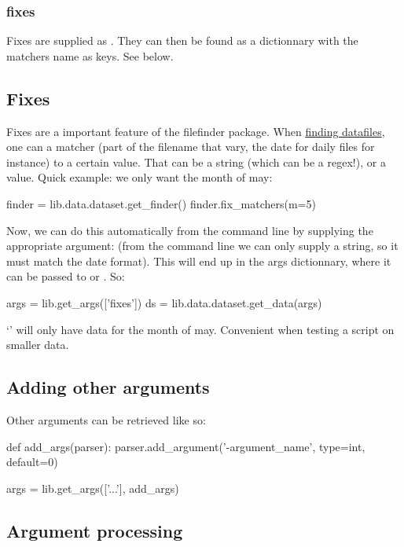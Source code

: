 \subsubsection{fixes}
Fixes are supplied as . They can then be found as a dictionnary with the matchers name as keys. %
See  below.

\subsection{Fixes}
\label{sec:org-fixes}
Fixes are a important feature of the filefinder package.
When \hyperref[sec:org-preregex]{finding datafiles}, one can  a matcher (part of the filename that vary, the date for daily files for instance) to a certain value.
That can be a string (which can be a regex!), or a value. Quick example: we only want the month of may:
\begin{python}
finder = lib.data.dataset.get_finder()
finder.fix_matchers(m=5)
\end{python}

Now, we can do this automatically from the command line by supplying the appropriate argument:  (from the command line we can only supply a string, so it must match the date format). This will end up in the args dictionnary, where it can be passed to  or . So:
\begin{python}
args = lib.get_args(['fixes'])
ds = lib.data.dataset.get_data(args)
\end{python}
`' will only have data for the month of may. Convenient when testing a script on smaller data.

\subsection{Adding other arguments}
Other arguments can be retrieved like so:
\begin{python}
def add_args(parser):
    parser.add_argument('-argument_name', type=int, default=0)

args = lib.get_args(['...'], add_args)
\end{python}

\subsection{Argument processing}
\label{sec:org-arg-processing}

